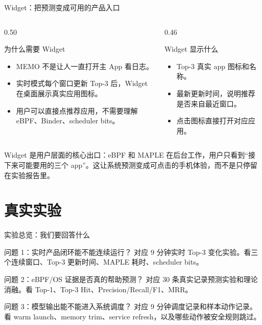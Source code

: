 \documentclass[UTF8,aspectratio=169,10pt]{ctexbeamer}
\newcommand{\explainfoot}[1]{%
  \vspace{0.35em}
  {\scriptsize\color{memoGray}#1}
}
\begin{document}
\begin{frame}{Widget：把预测变成可用的产品入口}
  \begin{columns}[T,totalwidth=\textwidth]
    \begin{column}{0.50\textwidth}
      \begin{block}{为什么需要 Widget}
        \begin{itemize}
          \item MEMO 不是让人一直打开主 App 看日志。
          \item 实时模式每个窗口更新 Top-3 后，Widget 在桌面展示真实应用图标。
          \item 用户可以直接点推荐应用，不需要理解 eBPF、Binder、scheduler bits。
        \end{itemize}
      \end{block}
    \end{column}
    \begin{column}{0.46\textwidth}
      \begin{block}{Widget 显示什么}
        \begin{itemize}
          \item Top-3 真实 app 图标和名称。
          \item 最新更新时间，说明推荐是否来自最近窗口。
          \item 点击图标直接打开对应应用。
        \end{itemize}
      \end{block}
    \end{column}
  \end{columns}
  \explainfoot{Widget 是用户层面的核心出口：eBPF 和 MAPLE 在后台工作，用户只看到“接下来可能要用的三个 app”。这让系统预测变成可点击的手机体验，而不是只停留在实验报告里。}
\end{frame}

\section{真实实验}

\begin{frame}{实验总览：我们要回答什么}
  \begin{block}{问题 1：实时产品闭环能不能连续运行？}
    对应 9 分钟实时 Top-3 变化实验。看三个连续窗口、Top-3 更新时间、MAPLE 耗时、scheduler bits。
  \end{block}
  \begin{block}{问题 2：eBPF/OS 证据是否真的帮助预测？}
    对应 30 条真实记录预测实验和理论消融。看 Top-1、Top-3 Hit、Precision/Recall/F1、MRR。
  \end{block}
  \begin{block}{问题 3：模型输出能不能进入系统调度？}
    对应 9 分钟调度记录和样本动作记录。看 warm launch、memory trim、service refresh，以及哪些动作被安全规则跳过。
  \end{block}
\end{frame}
\end{document}
